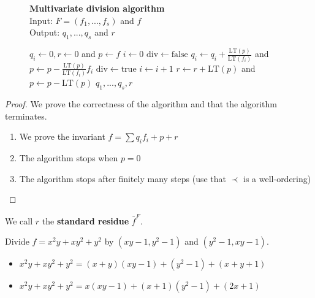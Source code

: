 \documentclass[a4paper, 11pt]{article}
\begin{document}
\begin{figure}[H]
  
\begin{mdframed}
  \textbf{Multivariate division algorithm}\\
  Input: \( F = (f_1,...,f_s) \) and \( f \)\\
  Output: \( q_1,...,q_s \) and \( r \)

  \begin{algorithmic}[1]
    \State \( q_i \gets 0, r \gets 0 \) and \( p \gets f \)
        \State $i \gets 0$
        \State $\mathrm{div}\gets  \mathrm{false}$
            \State \( q_i \gets q_i + \frac{\mathrm{LT}(p)}{\mathrm{LT}(f_i)} \) and  \( p \gets p - \frac{\mathrm{LT}(p)}{\mathrm{LT}(f_i)} f_i \)
            \State \( \mathrm{div} \gets \mathrm{true}  \)
          \Else 
            \State \( i \gets i + 1 \)
          \EndIf
        \EndWhile
          \State \( r \gets r + \mathrm{LT}(p) \) and \( p \gets p - \mathrm{LT}(p) \)
        \EndIf
    \EndWhile
    \State \Return \( q_1,...,q_s, r \)
  \end{algorithmic}
\end{mdframed}
\end{figure}

\begin{proof}
  We prove the correctness of the algorithm and that the algorithm terminates.
  \begin{enumerate}
    \item We prove the invariant \( f = \sum q_i f_i + p + r \)
    \item The algorithm stops when \( p = 0 \)
    \item The algorithm stops after finitely many steps (use that \( \prec \) is a well-ordering)
  \end{enumerate}
\end{proof}

\begin{defi}
  We call \( r \) the \textbf{standard residue} \( \bar{f}^F \).
\end{defi}

\begin{eg}
  Divide \( f = x^2y + xy^2 + y^2 \) by \( (xy - 1, y^2 -1) \) and \( (y^2 - 1, xy - 1) \).
  \begin{itemize}
    \item \( x^2y + xy^2 + y^2 = (x+y)(xy - 1) + (y^2 - 1) + (x+y+1) \)
    \item \( x^2y + xy^2 + y^2 = x(xy - 1) + (x + 1)(y^2 - 1) + (2x+1) \)
  \end{itemize}
\end{eg}
\end{document}
